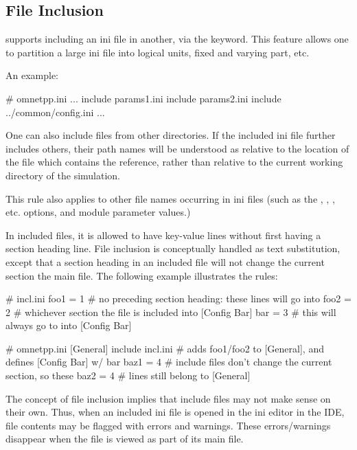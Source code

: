\subsection{File Inclusion}
\label{sec:config-sim:inifile-inclusion}

{\opp} supports including an ini file in another,
via the  keyword. This feature allows one to partition a large ini
file into logical units, fixed and varying part, etc.

An example:

\begin{inifile}
# omnetpp.ini
...
include params1.ini
include params2.ini
include ../common/config.ini
...
\end{inifile}

One can also include files from other directories. If the included ini file
further includes others, their path names will be understood as relative to
the location of the file which contains the reference, rather than relative
to the current working directory of the simulation.

This rule also applies to other file names occurring in ini files (such as
the , ,
, etc. options, and  module
parameter values.)

In included files, it is allowed to have key-value lines without first having a
section heading line. File inclusion is conceptually handled as text
substitution, except that a section heading in an included file will not
change the current section the main file. The following example illustrates
the rules:

\begin{inifile}
# incl.ini
foo1 = 1          # no preceding section heading: these lines will go into
foo2 = 2          # whichever section the file is included into
[Config Bar]
bar = 3           # this will always go to into [Config Bar]
\end{inifile}

\begin{inifile}
# omnetpp.ini
[General]
include incl.ini  # adds foo1/foo2 to [General], and defines [Config Bar] w/ bar
baz1 = 4          # include files don't change the current section, so these
baz2 = 4          # lines still belong to [General]
\end{inifile}

\begin{note}
The concept of file inclusion implies that include files may not make sense
on their own. Thus, when an included ini file is opened in the ini editor
in the IDE, file contents may be flagged with errors and warnings. These
errors/warnings disappear when the file is viewed as part of its main file.
\end{note}


